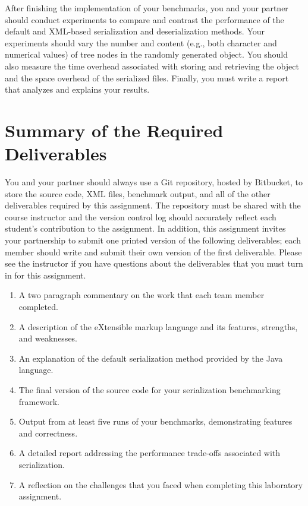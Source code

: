 After finishing the implementation of your benchmarks, you and your partner should conduct experiments to compare and
contrast the performance of the default and XML-based serialization and deserialization methods. Your experiments should
vary the number and content (e.g., both character and numerical values) of tree nodes in the randomly generated object.
You should also measure the time overhead associated with storing and retrieving the object and the space overhead
of the serialized files. Finally, you must write a report that analyzes and explains your results.

\section*{Summary of the Required Deliverables}

You and your partner should always use a Git repository, hosted by Bitbucket, to store the source code, XML files,
benchmark output, and all of the other deliverables required by this assignment. The repository must be shared with the
course instructor and the version control log should accurately reflect each student's contribution to the assignment.
In addition, this assignment invites your partnership to submit one printed version of the following deliverables; each
member should write and submit their own version of the first deliverable. Please see the instructor if you have
questions about the deliverables that you must turn in for this assignment.

\vspace*{-.1in}
\begin{enumerate}
  \setlength{\itemsep}{-.02pt}
  \item A two paragraph commentary on the work that each team member completed. 
  \item A description of the eXtensible markup language and its features, strengths, and weaknesses.
  \item An explanation of the default serialization method provided by the Java language.
  \item The final version of the source code for your serialization benchmarking framework.
  \item Output from at least five runs of your benchmarks, demonstrating features and correctness.
  \item A detailed report addressing the performance trade-offs associated with serialization.
  \item A reflection on the challenges that you faced when completing this laboratory assignment.
\end{enumerate}
\vspace*{-.1in}

